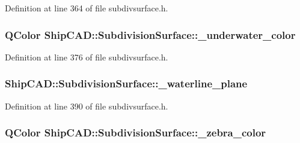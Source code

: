Definition at line 364 of file subdivsurface.\-h.

\hypertarget{classShipCAD_1_1SubdivisionSurface_a8a64eabb53fa0facaa6e59579305328b}{
\subsubsection[{\-\_\-underwater\-\_\-color}]{\setlength{\rightskip}{0pt plus 5cm}Q\-Color Ship\-C\-A\-D\-::\-Subdivision\-Surface\-::\-\_\-underwater\-\_\-color\hspace{0.3cm}{\ttfamily [protected]}}}\label{classShipCAD_1_1SubdivisionSurface_a8a64eabb53fa0facaa6e59579305328b}


Definition at line 376 of file subdivsurface.\-h.

\hypertarget{classShipCAD_1_1SubdivisionSurface_a762de21a330588c7bfbe081637cab2f3}{
\subsubsection[{\-\_\-waterline\-\_\-plane}]{ Ship\-C\-A\-D\-::\-Subdivision\-Surface\-::\-\_\-waterline\-\_\-plane\hspace{0.3cm}{\ttfamily [protected]}}}\label{classShipCAD_1_1SubdivisionSurface_a762de21a330588c7bfbe081637cab2f3}


Definition at line 390 of file subdivsurface.\-h.

\hypertarget{classShipCAD_1_1SubdivisionSurface_a047d5d0575c944d216ada589e30ee3bd}{
\subsubsection[{\-\_\-zebra\-\_\-color}]{\setlength{\rightskip}{0pt plus 5cm}Q\-Color Ship\-C\-A\-D\-::\-Subdivision\-Surface\-::\-\_\-zebra\-\_\-color\hspace{0.3cm}{\ttfamily [protected]}}}\label{classShipCAD_1_1SubdivisionSurface_a047d5d0575c944d216ada589e30ee3bd}


